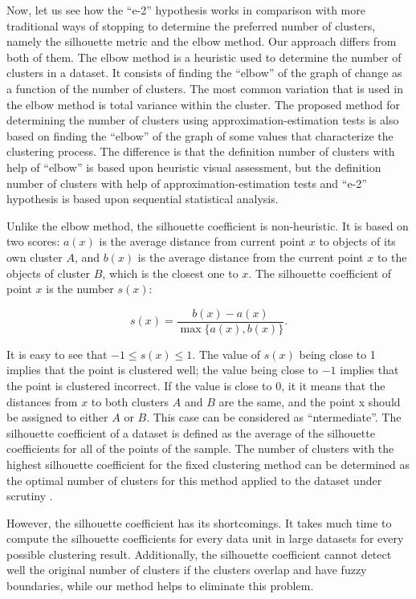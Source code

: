 Now, let us see how the “e-2” hypothesis works in comparison with more traditional ways of stopping to determine the preferred number of clusters, namely the silhouette metric and the elbow method. Our approach differs from both of them. The elbow method is a heuristic used to determine the number of clusters in a dataset. It consists of finding the “elbow” of the graph of change as a function of the number of clusters. The most common variation that is used in the elbow method is total variance within the cluster. The proposed method for determining the number of clusters using approximation-estimation tests is also based on finding the “elbow” of the graph of some values that characterize the clustering process. The difference is that the definition number of clusters with help of “elbow” is based upon heuristic visual assessment, but the definition number of clusters with help of approximation-estimation tests and “e-2” hypothesis is based upon sequential statistical analysis.

Unlike the elbow method, the silhouette coefficient is non-heuristic. It is based on two scores: \(a(x)\) is the average distance from current point \(x\) to objects of its own cluster \(A\), and \(b(x)\) is the average distance from the current point \(x\) to the objects of cluster \(B\), which is the closest one to \(x\). The silhouette coefficient of point \(x\) is the number \(s(x)\):


\begin{equation}
	\label{eqn:50}
	s(x) = \frac{b(x) - a(x)}{\max\{a(x), b(x)\}}.
\end{equation}

It is easy to see that \(-1 \le s(x) \le 1\). The value of \(s(x)\) being close to 1 implies that the point is clustered well; the value being close to \(-1\) implies that the point is clustered incorrect. If the value is close to 0, it it means that the distances from \(x\) to both clusters \(A\) and \(B\) are the same, and the point x should be assigned to either \(A\) or \(B\). This case can be considered as “ntermediate”. The silhouette coefficient of a dataset is defined as the average of the silhouette coefficients for all of the points of the sample. The number of clusters with the highest silhouette coefficient for the fixed clustering method can be determined as the optimal number of clusters for this method applied to the dataset under scrutiny \cite{Rousseeuw}.

However, the silhouette coefficient has its shortcomings. It takes much time to compute the silhouette coefficients for every data unit in large datasets for every possible clustering result. Additionally, the silhouette coefficient cannot detect well the original number of clusters if the clusters overlap and have fuzzy boundaries, while our method helps to eliminate this problem.

